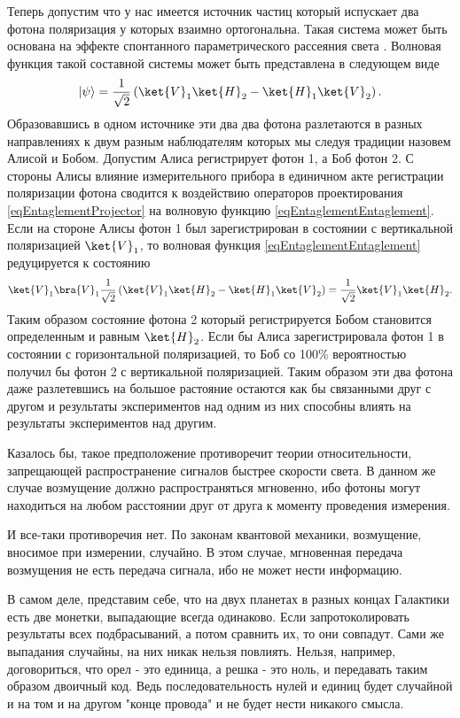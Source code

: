 Теперь допустим что у нас имеется источник частиц который испускает два фотона поляризация 
у которых взаимно ортогональна. Такая система может быть основана на эффекте спонтанного 
параметрического рассеяния света \cite{bKlishko}. Волновая функция такой составной системы 
может быть представлена в следующем виде
\begin{equation}
\left|\psi\right> = \frac{1}{\sqrt{2}}\left(
\ket{V}_1\ket{H}_2 - \ket{H}_1\ket{V}_2
\right).
\label{eqEntaglementEntaglement}
\end{equation}
Образовавшись в одном источнике эти два два фотона разлетаются в разных направлениях к двум разным
наблюдателям которых мы следуя традиции назовем Алисой и Бобом. Допустим Алиса регистрирует фотон 1, а 
Боб фотон 2. С стороны Алисы влияние измерительного прибора в единичном акте регистрации поляризации
фотона сводится к воздействию операторов проектирования \eqref{eqEntaglementProjector} на 
волновую функцию \eqref{eqEntaglementEntaglement}. Если на стороне Алисы фотон 1 был зарегистрирован в
состоянии с вертикальной поляризацией $\ket{V}_1$, то волновая функция \eqref{eqEntaglementEntaglement}
редуцируется к состоянию
\begin{equation}
\ket{V}_1\bra{V}_1 
\frac{1}{\sqrt{2}} \left(
\ket{V}_1\ket{H}_2 - \ket{H}_1\ket{V}_2
\right) = \frac{1}{\sqrt{2}}
\ket{V}_1\ket{H}_2.
\nonumber
\end{equation}
Таким образом состояние фотона 2 который регистрируется Бобом становится определенным и равным $\ket{H}_2$.
Если бы Алиса зарегистрировала фотон 1 в состоянии с горизонтальной поляризацией, то Боб со 100\% вероятностью 
получил бы фотон 2 с вертикальной поляризацией. Таким образом эти два фотона даже разлетевшись на большое 
растояние остаются как бы связанными друг с другом и результаты экспериментов
над одним из них способны влиять на результаты экспериментов над другим. 

Казалось бы, такое предположение противоречит теории относительности, запрещающей распространение сигналов быстрее скорости света. 
В данном же случае возмущение должно распространяться мгновенно, ибо фотоны могут находиться на любом расстоянии друг 
от друга к моменту проведения измерения.

И все-таки противоречия нет. По законам квантовой механики, возмущение, вносимое при измерении, случайно. В этом случае, мгновенная передача возмущения не есть передача сигнала, ибо не может нести информацию.

В самом деле, представим себе, что на двух планетах в разных концах Галактики есть две монетки, выпадающие всегда одинаково. Если запротоколировать результаты всех подбрасываний, а потом сравнить их, то они совпадут. Сами же выпадания случайны, на них никак нельзя повлиять. Нельзя, например, договориться, что орел - это единица, а решка - это ноль, и передавать таким образом двоичный код. Ведь последовательность нулей и единиц будет случайной и на том и на другом "конце провода" и не будет нести никакого смысла.

